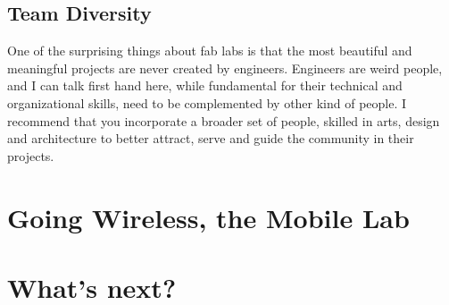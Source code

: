 \documentclass[a4paper,12pt,titlepage]{article}
\begin{document}
\subsection{Team Diversity}
One of the surprising things about fab labs is that the most beautiful and meaningful projects are never created by engineers. Engineers are weird people, and I can talk first hand here, while fundamental for their technical and organizational skills, need to be complemented by other kind of people. I
recommend that you incorporate a broader set of people, skilled in arts, design and
architecture to better attract, serve and guide the community in their projects. 

\section{Going Wireless, the Mobile Lab}



\section{What's next?}
\end{document}
